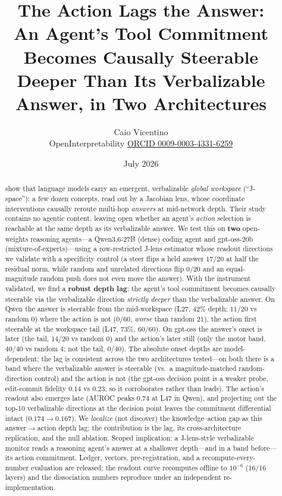 \documentclass[11pt]{article}
\title{The Action Lags the Answer:\\
An Agent's Tool Commitment Becomes Causally Steerable\\
Deeper Than Its Verbalizable Answer, in Two Architectures}
\author{Caio Vicentino\\
OpenInterpretability \quad \href{https://orcid.org/0009-0003-4331-6259}{ORCID 0009-0003-4331-6259}}
\date{July 2026}
\begin{document}
\maketitle

\begin{abstract}
\citet{anthropic2026workspace} show that language models carry an emergent, verbalizable
\emph{global workspace} (``J-space''): a few dozen concepts, read out by a Jacobian lens, whose
coordinate interventions causally reroute multi-hop \emph{answers} at mid-network depth. Their study
contains no agentic content, leaving open whether an agent's \emph{action} selection is reachable at
the same depth as its verbalizable answer. We test this on \textbf{two} open-weights reasoning
agents---a Qwen3.6-27B (dense) coding agent and gpt-oss-20b (mixture-of-experts)---using a row-restricted J-lens
estimator whose readout directions we validate with a specificity control (a steer flips a held
answer $17/20$ at half the residual norm, while random and unrelated directions flip $0/20$ and an
equal-magnitude random push does not even move the answer). With the instrument validated, we find a
\textbf{robust depth lag}: the agent's tool commitment becomes causally steerable via the verbalizable
direction \emph{strictly deeper} than the verbalizable answer. On Qwen the answer is steerable from
the mid-workspace (L27, 42\% depth; $11/20$ vs random $0$) where the action is not
($0/60$, \emph{worse} than random $21$), the action first steerable at the workspace tail (L47, 73\%,
$60/60$). On gpt-oss the answer's onset is later (the tail, $14/20$ vs random $0$) and the action's
later still (only the motor band, $40/40$ vs random $4$; not the tail, $0/40$). The absolute onset
depths are model-dependent; the lag is consistent across the two architectures tested---on both there
is a band where the verbalizable answer is steerable (vs.\ a magnitude-matched random-direction
control) and the action is not (the gpt-oss decision point is a weaker probe, edit-commit fidelity
$0.14$ vs $0.23$, so it corroborates rather than leads). The action's readout also emerges late
(AUROC peaks $0.74$ at L47 in Qwen), and projecting out the top-10 verbalizable directions at the
decision point leaves the commitment differential intact ($0.174 \rightarrow 0.167$). We
\emph{localize} (not discover) the knowledge--action gap \citep{basu2026gap} as this
answer$\rightarrow$action depth lag; the contribution is the lag, its cross-architecture replication,
and the null ablation. Scoped implication: a J-lens-style verbalizable monitor reads a reasoning
agent's answer at a shallower depth---and in a band before---its action commitment. Ledger, vectors,
pre-registration, and a recompute-every-number evaluation are released; the readout curve recomputes
offline to $10^{-6}$ (16/16 layers) and the dissociation numbers reproduce under an independent
re-implementation.
\end{abstract}
\end{document}

